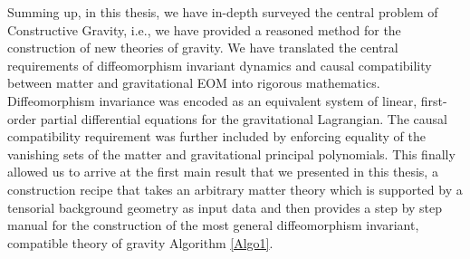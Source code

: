 Summing up, in this thesis, we have in-depth surveyed the central problem of Constructive Gravity, i.e., we have provided a reasoned method for the construction of new theories of gravity. We have translated the central requirements of diffeomorphism invariant dynamics and causal compatibility between matter and gravitational EOM into rigorous mathematics. Diffeomorphism invariance was encoded as an equivalent system of linear, first-order partial differential equations for the gravitational Lagrangian. The causal compatibility requirement was further included by enforcing equality of the vanishing sets of the matter and gravitational principal polynomials.
This finally allowed us to arrive at the first main result that we presented in this thesis, a construction recipe that takes an arbitrary matter theory which is supported by a tensorial background geometry as input data and then provides a step by step manual for the construction of the most general diffeomorphism invariant, compatible theory of gravity Algorithm \ref{Algo1}. 

